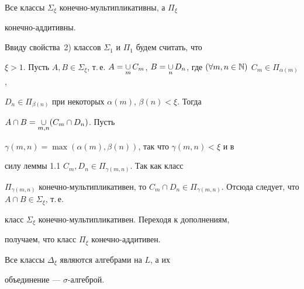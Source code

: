  


 


\begin{lems} 


Все классы $\Sigma_\xi$ конечно-мультипликативны, а $\Pi_\xi$ 


конечно-аддитивны. 


\end{lems} 


 


\begin{pf} 


Ввиду свойства~2) классов $\Sigma_1$ и $\Pi_1$ будем считать, что 


$\xi>1$. Пусть $A,B\in\Sigma_\xi$, т.\,е. $A=\mycup_m C_m$, $B=\mycup_n 


D_n$, где $(\forall m,n\in\Bbb N)$ $C_m\in\Pi_{\alpha(m)}$, 


$D_n\in\Pi_{\beta(n)}$ при некоторых $\alpha(m)$, $\beta(n)<\xi$. Тогда 


$A\cap B=\mathop{\cup}\limits_{m,n}(C_m\cap D_n)$. Пусть 


$\gamma(m,n)=\max(\alpha(m),\beta(n))$, так что $\gamma(m,n)<\xi$ и в 


силу леммы 1.1 $C_m,D_n\in\Pi_{\gamma(m,n)}$. Так как класс 


$\Pi_{\gamma(m,n)}$ конечно-мультипликативен, то $C_m\cap D_n\in 


\Pi_{\gamma(m,n)}$. Отсюда следует, что $A\cap B\in\Sigma_\xi$, т.\,е. 


класс $\Sigma_\xi$ конечно-мультипликативен. Переходя к дополнениям, 


получаем, что класс $\Pi_\xi$ конечно-аддитивен. 


\end{pf} 


 


\begin{lems} 


Все классы $\Delta_\xi$ являются алгебрами на $L$, а их 


объединение --- $\sigma$-алгеброй. 


\end{lems} 


 


